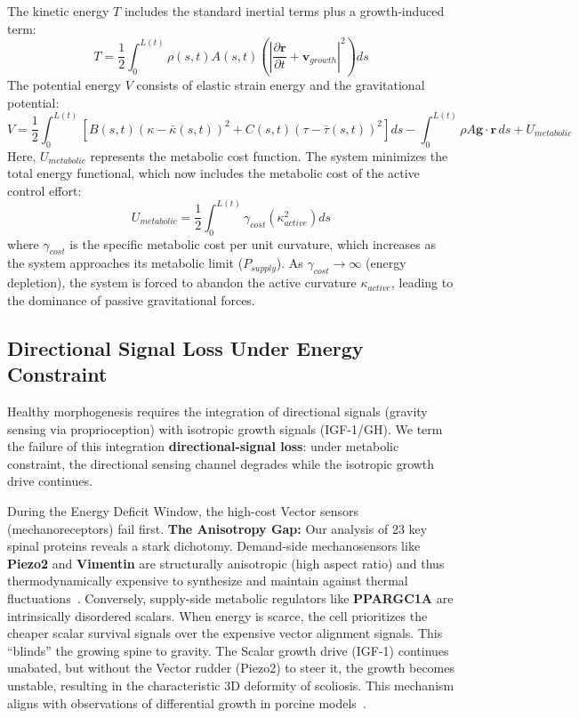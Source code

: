 The kinetic energy $T$ includes the standard inertial terms plus a growth-induced term:
\begin{equation}
T = \frac{1}{2} \int_0^{L(t)} \rho(s,t) A(s,t) \left( \left| \frac{\partial \mathbf{r}}{\partial t} + \mathbf{v}_{growth} \right|^2 \right) ds
\end{equation}
The potential energy $V$ consists of elastic strain energy and the gravitational potential:
\begin{equation}
V = \frac{1}{2} \int_0^{L(t)} \left[ B(s,t) (\kappa - \bar{\kappa}(s,t))^2 + C(s,t) (\tau - \bar{\tau}(s,t))^2 \right] ds - \int_0^{L(t)} \rho A \mathbf{g} \cdot \mathbf{r} \, ds + U_{metabolic}
\end{equation}
Here, $U_{metabolic}$ represents the metabolic cost function. The system minimizes the total energy functional, which now includes the metabolic cost of the active control effort:
\begin{equation}
U_{metabolic} = \frac{1}{2} \int_0^{L(t)} \gamma_{cost} \left( \kappa_{active}^2 \right) ds
\end{equation}
where $\gamma_{cost}$ is the specific metabolic cost per unit curvature, which increases as the system approaches its metabolic limit ($P_{supply}$). As $\gamma_{cost} \to \infty$ (energy depletion), the system is forced to abandon the active curvature $\kappa_{active}$, leading to the dominance of passive gravitational forces.

\subsection{Directional Signal Loss Under Energy Constraint}

Healthy morphogenesis requires the integration of directional signals (gravity sensing via proprioception) with isotropic growth signals (IGF-1/GH). We term the failure of this integration \textbf{directional-signal loss}: under metabolic constraint, the directional sensing channel degrades while the isotropic growth drive continues.

During the Energy Deficit Window, the high-cost Vector sensors (mechanoreceptors) fail first.
\textbf{The Anisotropy Gap:} Our analysis of 23 key spinal proteins reveals a stark dichotomy. Demand-side mechanosensors like \textbf{Piezo2} and \textbf{Vimentin} are structurally anisotropic (high aspect ratio) and thus thermodynamically expensive to synthesize and maintain against thermal fluctuations~\cite{lynch2015bioenergetic}. Conversely, supply-side metabolic regulators like \textbf{PPARGC1A} are intrinsically disordered scalars.
When energy is scarce, the cell prioritizes the cheaper scalar survival signals over the expensive vector alignment signals. This ``blinds'' the growing spine to gravity. The Scalar growth drive (IGF-1) continues unabated, but without the Vector rudder (Piezo2) to steer it, the growth becomes unstable, resulting in the characteristic 3D deformity of scoliosis. This mechanism aligns with observations of differential growth in porcine models~\cite{newton2005differential}.

